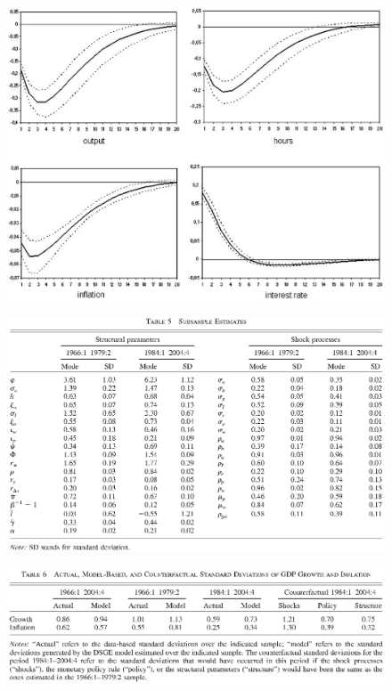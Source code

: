 \documentclass{beamer}
\begin{document}
\begin{frame}
  \begin{figure}
    \includegraphics[scale=.8]{sw_figure6.eps}
  \end{figure}
\end{frame}

\begin{frame}
  \begin{figure}
    \includegraphics[scale=.7]{sw_table5.eps}
  \end{figure}
\end{frame}

\begin{frame}
  \begin{figure}
    \includegraphics[scale=.7]{sw_table6.eps}
  \end{figure}
\end{frame}

\end{document}
